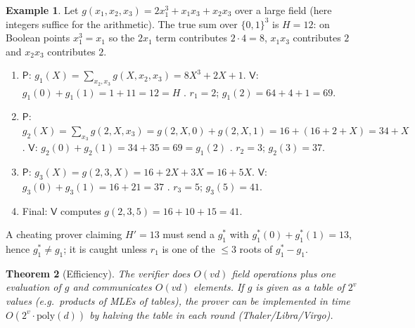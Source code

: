 \documentclass[11pt,a4paper]{report}
\theoremstyle{plain}
\newtheorem{theorem}{Theorem}[chapter]
\theoremstyle{definition}
\newtheorem{example}[theorem]{Example}
\theoremstyle{remark}
\newcommand{\poly}{\mathrm{poly}}
\newcommand{\Prv}{\mathsf{P}}\newcommand{\Ver}{\mathsf{V}}
\begin{document}
\begin{example}\label{ex:sumcheck}
Let $g(x_1,x_2,x_3)=2x_1^3+x_1x_3+x_2x_3$ over a large field (here integers suffice for the arithmetic). The true sum over $\{0,1\}^3$ is $H=12$: on Boolean points $x_1^3=x_1$ so the $2x_1$ term contributes $2\cdot4=8$, $x_1x_3$ contributes $2$ and $x_2x_3$ contributes $2$.
\begin{enumerate}
\item $\Prv$: $g_1(X)=\sum_{x_2,x_3}g(X,x_2,x_3)=8X^3+2X+1$. $\Ver$: $g_1(0)+g_1(1)=1+11=12=H$ \checkmark. $r_1=2$; $g_1(2)=64+4+1=69$.
\item $\Prv$: $g_2(X)=\sum_{x_3}g(2,X,x_3)=g(2,X,0)+g(2,X,1)=16+(16+2+X)=34+X$. $\Ver$: $g_2(0)+g_2(1)=34+35=69=g_1(2)$ \checkmark. $r_2=3$; $g_2(3)=37$.
\item $\Prv$: $g_3(X)=g(2,3,X)=16+2X+3X=16+5X$. $\Ver$: $g_3(0)+g_3(1)=16+21=37$ \checkmark. $r_3=5$; $g_3(5)=41$.
\item Final: $\Ver$ computes $g(2,3,5)=16+10+15=41$. \checkmark
\end{enumerate}
A cheating prover claiming $H'=13$ must send a $g_1^*$ with $g^*_1(0)+g^*_1(1)=13$, hence $g_1^*\ne g_1$; it is caught unless $r_1$ is one of the $\le3$ roots of $g_1^*-g_1$.
\end{example}
\begin{theorem}[Efficiency]
The verifier does $O(vd)$ field operations plus one evaluation of $g$ and communicates $O(vd)$ elements. If $g$ is given as a table of $2^v$ values (e.g.\ products of MLEs of tables), the prover can be implemented in time $O(2^v\cdot\poly(d))$ by halving the table in each round (Thaler/Libra/Virgo).
\end{theorem}
\end{document}
